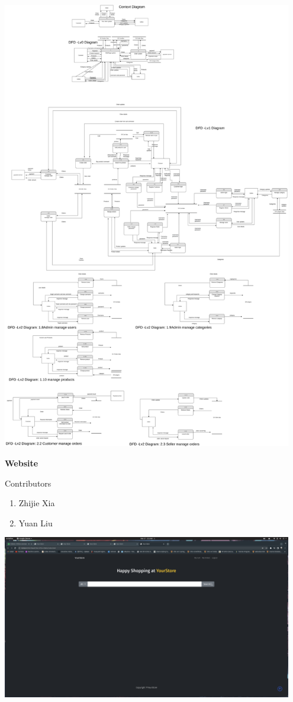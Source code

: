 \documentclass[12pt]{article}
\begin{document}
\includegraphics[width=0.95\textwidth]{DFD/DFD.png}



\newpage
\textbf{Website}

Contributors
\begin{enumerate}
    \item Zhijie Xia
    \item Yuan Liu
\end{enumerate}


\includegraphics[width=0.95\textwidth]{Screenshots/home_index.png}
\end{document}
